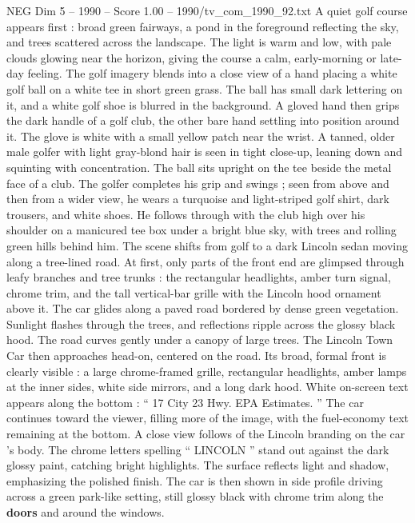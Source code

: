 \begin{textsample}{NEG Dim 5 – 1990 – Score 1.00 – 1990/tv\_com\_1990\_92.txt}  \label{ex:f5_neg_085}
A quiet golf course appears first : broad green fairways, a pond in the foreground reflecting the sky, and trees scattered across the landscape.
The light is warm and low, with pale clouds glowing near the horizon, giving the course a calm, early-morning or late-day feeling.
The golf imagery blends into a close view of a hand placing a white golf ball on a white tee in short green grass.
The ball has small dark lettering on it, and a white golf shoe is blurred in the background.
A gloved hand then grips the dark handle of a golf club, the other bare hand settling into position around it.
The glove is white with a small yellow patch near the wrist.
A tanned, older male golfer with light gray-blond hair is seen in tight close-up, leaning down and squinting with concentration.
The ball sits upright on the tee beside the metal face of a club.
The golfer completes his grip and swings ; seen from above and then from a wider view, he wears a turquoise and light-striped golf shirt, dark trousers, and white shoes.
He follows through with the club high over his shoulder on a manicured tee box under a bright blue sky, with trees and rolling green hills behind him.
The scene shifts from golf to a dark Lincoln sedan moving along a tree-lined road.
At first, only parts of the front end are glimpsed through leafy branches and tree trunks : the rectangular headlights, amber turn signal, chrome trim, and the tall vertical-bar grille with the Lincoln hood ornament above it.
The car glides along a paved road bordered by dense green vegetation.
Sunlight flashes through the trees, and reflections ripple across the glossy black hood.
The road curves gently under a canopy of large trees.
The Lincoln Town Car then approaches head-on, centered on the road.
Its broad, formal front is clearly visible : a large chrome-framed grille, rectangular headlights, amber lamps at the inner sides, white side mirrors, and a long dark hood.
White on-screen text appears along the bottom : “ 17 City 23 Hwy.
EPA Estimates. ” The car continues toward the viewer, filling more of the image, with the fuel-economy text remaining at the bottom.
A close view follows of the Lincoln branding on the car ’s body.
The chrome letters spelling “ LINCOLN ” stand out against the dark glossy paint, catching bright highlights.
The surface reflects light and shadow, emphasizing the polished finish.
The car is then shown in side profile driving across a green park-like setting, still glossy black with chrome trim along the \textbf{doors} and around the windows.

\end{textsample}
